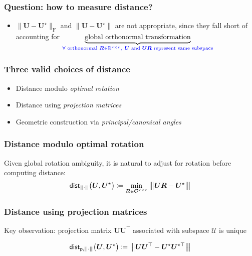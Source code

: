 \documentclass[compress,
mathserif,wide,%
]{beamer}
\begin{document}
\begin{frame}
\frametitle{Question: how to measure distance?}

	\begin{itemize}
		\item  $\|\bm{U}-\bm{U}^\star\|_{\mathrm{F}}$ and $\|\bm{U}-\bm{U}^\star\|$ are not appropriate,  since they fall short of accounting for 
			\hspace{-3.5em} $\underset{\textcolor{blue}{ \forall\text{ orthonormal } \bm{R}\in \mathbb{R}^{r\times r}, ~\bm{U} \text{ and } \bm{U}\bm{R} \text{ represent same subspace}}}{\underbrace{\text{global orthonormal transformation}}}$ 
	
	\end{itemize}

\end{frame}

\begin{frame}
	\frametitle{Three valid choices of distance}
	\begin{itemize}
		\item Distance modulo \emph{optimal rotation}
		\item Distance using \emph{projection matrices}
		\item Geometric construction via \emph{principal/canonical angles}
	\end{itemize}
\end{frame}


\begin{frame}
	\frametitle{Distance modulo optimal rotation}
	Given global rotation ambiguity, it is natural to adjust for rotation before computing distance:
	\begin{align*}
	\mathsf{dist}_{{\left\vert\kern-0.25ex\left\vert\kern-0.25ex\left\vert \cdot \right\vert\kern-0.25ex\right\vert\kern-0.25ex\right\vert}}\big(\bm{U},{\bm{U}}^{\star}\big) \coloneqq
	\min _{\bm{R}\in \mathcal{O}^{r\times r}} {\big\vert\kern-0.25ex\big\vert\kern-0.25ex\big\vert  \bm{U} \bm{R} - \bm{U}^{\star}   \big\vert\kern-0.25ex\big\vert\kern-0.25ex\big\vert} 
\end{align*}
\end{frame}

\begin{frame}
	\frametitle{Distance using projection matrices}
	Key observation: projection matrix $\bm{U} \bm{U}^{\top}$ associated with subspace $\mathcal{U}$ is unique

	\begin{equation*}
	\mathsf{dist}_{\mathsf{p},{\left\vert\kern-0.25ex\left\vert\kern-0.25ex\left\vert \cdot \right\vert\kern-0.25ex\right\vert\kern-0.25ex\right\vert}}\big(\bm{U},{\bm{U}}^{\star}\big) \coloneqq {\big\vert\kern-0.25ex\big\vert\kern-0.25ex\big\vert \bm{U} \bm{U}^{\top}- {\bm{U}}^{\star} {\bm{U}}^{\star\top} \big\vert\kern-0.25ex\big\vert\kern-0.25ex\big\vert}
\end{equation*}
\end{frame}
\end{document}
